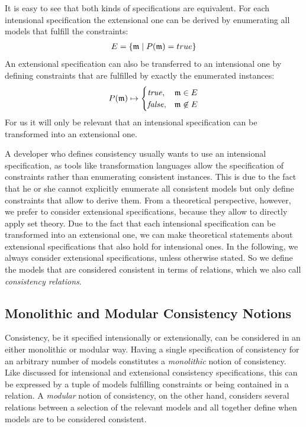 It is easy to see that both kinds of specifications are equivalent. For each intensional specification the extensional one can be derived by enumerating all models that fulfill the constraints:
\begin{align*}
    E = \{ \mathfrak{m} \mid P(\mathfrak{m}) = true \}
\end{align*}
An extensional specification can also be transferred to an intensional one by defining constraints that are fulfilled by exactly the enumerated instances:
\begin{align*}
    P(\mathfrak{m}) \mapsto 
    \begin{cases} 
        \mathit{true}, & \mathfrak{m} \in E\\
        \mathit{false}, & \mathfrak{m} \not\in E\\
    \end{cases}
\end{align*}
For us it will only be relevant that an intensional specification can be transformed into an extensional one.

A developer who defines consistency usually wants to use an intensional specification, as tools like transformation languages allow the specification of constraints rather than enumerating consistent instances. This is due to the fact that he or she cannot explicitly enumerate all consistent models but only define constraints that allow to derive them.
From a theoretical perspective, however, we prefer to consider extensional specifications, because they allow to directly apply set theory.
Due to the fact that each intensional specification can be transformed into an extensional one, we can make theoretical statements about extensional specifications that also hold for intensional ones.
In the following, we always consider extensional specifications, unless otherwise stated.
So we define the models that are considered consistent in terms of relations, which we also call \emph{consistency relations}.


\subsection{Monolithic and Modular Consistency Notions}
\label{chap:correctness:notions_consistency:monolithic_modular}

Consistency, be it specified intensionally or extensionally, can be considered in an either monolithic or modular way.
Having a single specification of consistency for an arbitrary number of models constitutes a \emph{monolithic} notion of consistency.
Like discussed for intensional and extensional consistency specifications, this can be expressed by a tuple of models fulfilling constraints or being contained in a relation.
A \emph{modular} notion of consistency, on the other hand, considers several relations between a selection of the relevant models and all together define when models are to be considered consistent.

